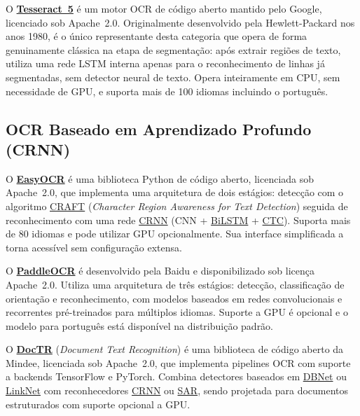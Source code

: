 \documentclass[
  12pt,
  oneside,
  a4paper,
  chapter=TITLE,
  section=TITLE,
  english,
  brazil
]{abntex2}
\begin{document}
O \href{https://github.com/tesseract-ocr/tesseract}{\textbf{Tesseract~5}}
\cite{smith2019} é um motor OCR de código aberto mantido pelo Google, licenciado sob
Apache~2.0. Originalmente desenvolvido pela Hewlett-Packard nos anos 1980, é o único
representante desta categoria que opera de forma genuinamente clássica na etapa de
segmentação: após extrair regiões de texto, utiliza uma rede LSTM interna apenas para o
reconhecimento de linhas já segmentadas, sem detector neural de texto. Opera inteiramente
em CPU, sem necessidade de GPU, e suporta mais de 100 idiomas incluindo o português.

\subsection{OCR Baseado em Aprendizado Profundo (CRNN)}

O \href{https://github.com/JaidedAI/EasyOCR}{\textbf{EasyOCR}} \cite{easyocr2020} é
uma biblioteca Python de código aberto, licenciada sob Apache~2.0, que implementa uma
arquitetura de dois estágios: detecção com o algoritmo
\href{https://arxiv.org/abs/1904.01941}{CRAFT} (\textit{Character Region Awareness for
Text Detection}) seguida de reconhecimento com uma rede
\href{https://arxiv.org/abs/1507.05717}{CRNN} (CNN +
\href{https://en.wikipedia.org/wiki/Long_short-term_memory}{BiLSTM} +
\href{https://en.wikipedia.org/wiki/Connectionist_temporal_classification}{CTC}).
Suporta mais de 80 idiomas e pode utilizar GPU opcionalmente. Sua interface simplificada
a torna acessível sem configuração extensa.

O \href{https://github.com/PaddlePaddle/PaddleOCR}{\textbf{PaddleOCR}}
\cite{paddleocr2022} é desenvolvido pela Baidu e disponibilizado sob licença Apache~2.0.
Utiliza uma arquitetura de três estágios: detecção, classificação de orientação e
reconhecimento, com modelos baseados em redes convolucionais e recorrentes
pré-treinados para múltiplos idiomas. Suporte a GPU é opcional e o modelo para português
está disponível na distribuição padrão.

O \href{https://github.com/mindee/doctr}{\textbf{DocTR}} (\textit{Document Text
Recognition}) \cite{doctr2021} é uma biblioteca de código aberto da Mindee, licenciada
sob Apache~2.0, que implementa pipelines OCR com suporte a backends TensorFlow e PyTorch.
Combina detectores baseados em \href{https://arxiv.org/abs/1911.08947}{DBNet} ou
\href{https://arxiv.org/abs/1707.03718}{LinkNet} com reconhecedores
\href{https://arxiv.org/abs/1507.05717}{CRNN} ou
\href{https://arxiv.org/abs/1811.00751}{SAR}, sendo projetada para documentos
estruturados com suporte opcional a GPU.
\end{document}
